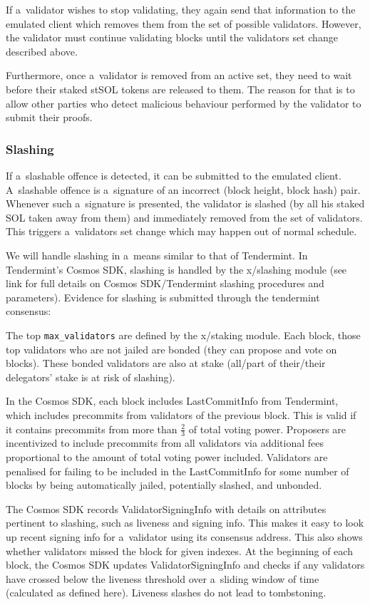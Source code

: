\documentclass[sigplan,screen,authorversion]{acmart}
\begin{document}
If a~validator wishes to stop validating, they again send that
information to the emulated client which removes them from the set of
possible validators.  However, the validator must continue validating
blocks until the validators set change described above.

Furthermore, once a~validator is removed from an active set, they need
to wait before their staked stSOL tokens are released to them.  The
reason for that is to allow other parties who detect malicious
behaviour performed by the validator to submit their proofs.

\subsubsection{Slashing}

If a~slashable offence is detected, it can be submitted to the
emulated client.  A~slashable offence is a~signature of an incorrect
(block height, block hash) pair.  Whenever such a~signature is
presented, the validator is slashed (by all his staked SOL taken away
from them) and immediately removed from the set of validators.  This
triggers a~validators set change which may happen out of normal
schedule.

We will handle slashing in a~means similar to that of Tendermint. In
Tendermint’s Cosmos SDK, slashing is handled by the x/slashing module
(see link for full details on Cosmos SDK/Tendermint slashing
procedures and parameters). Evidence for slashing is submitted through
the tendermint consensus:

The top \verb|max_validators| are defined by the x/staking
module. Each block, those top validators who are not jailed are bonded
(they can propose and vote on blocks). These bonded validators are
also at stake (all/part of their/their delegators’ stake is at risk of
slashing).

In the Cosmos SDK, each block includes LastCommitInfo from Tendermint,
which includes precommits from validators of the previous block.  This
is valid if it contains precommits from more than $\frac23$ of total
voting power. Proposers are incentivized to include precommits from
all validators via additional fees proportional to the amount of total
voting power included.  Validators are penalised for failing to be
included in the LastCommitInfo for some number of blocks by being
automatically jailed, potentially slashed, and unbonded.

The Cosmos SDK records ValidatorSigningInfo with details on attributes
pertinent to slashing, such as liveness and signing info.  This makes
it easy to look up recent signing info for a~validator using its
consensus address. This also shows whether validators missed the block
for given indexes. At the beginning of each block, the Cosmos SDK
updates ValidatorSigningInfo and checks if any validators have crossed
below the liveness threshold over a~sliding window of time (calculated
as defined here). Liveness slashes do not lead to tombstoning.
\end{document}
